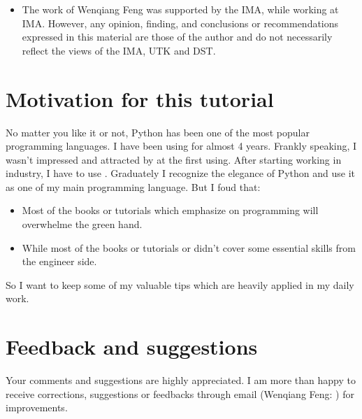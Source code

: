 \documentclass[letterpaper,12pt,english]{sphinxmanual}
\begin{document}
\begin{itemize}
\item {} 

The work of Wenqiang Feng was supported by the IMA, while working at IMA. However, any opinion, finding, and conclusions or recommendations expressed in this material are those of the author and do not necessarily reflect the views of the IMA, UTK and DST.

\end{itemize}


\section{Motivation for this tutorial}
\label{\detokenize{preface:motivation-for-this-tutorial}}
No matter you like it or not, Python has been one of the most popular programming languages.
I have been using  for almost 4 years. Frankly speaking, I wasn't impressed and attracted
by  at the first using. After starting working in industry, I have to use . Graduately
I recognize the elegance of Python and use it as one of my main programming language. But I foud that:
\begin{itemize}
\item {} 
Most of the  books or tutorials which emphasize on programming will overwhelme the green hand.

\item {} 
While most of the  books or tutorials  or  didn't cover some essential skills from the engineer side.

\end{itemize}

So I want to keep some of my valuable tips which are heavily applied in my daily work.


\section{Feedback and suggestions}
\label{\detokenize{preface:feedback-and-suggestions}}
Your comments and suggestions are highly appreciated. I am more than happy to receive
corrections, suggestions or feedbacks through email (Wenqiang Feng: ) for improvements.
\end{document}
